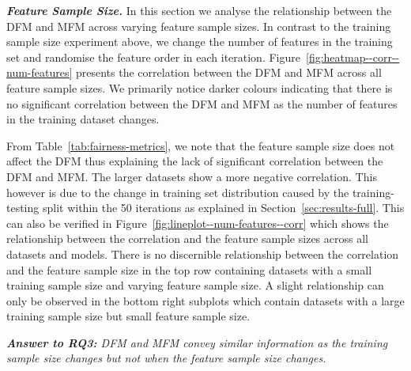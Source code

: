 \documentclass[sigconf,review,anonymous]{acmart}
\newcommand{\highlight}[1]{\begin{framed}%
  \noindent\emph{#1}
\end{framed}}
\begin{document}
\textbf{\emph{Feature Sample Size.}} In this section we analyse the
relationship between the DFM and MFM across varying feature sample
sizes. In contrast to the training sample size experiment above, we
change the number of features in the training set and randomise the
feature order in each
iteration. Figure \ref{fig:heatmap--corr--num-features} presents the
correlation between the DFM and MFM across all feature sample
sizes. We primarily notice darker colours indicating that there is no
significant correlation between the DFM and MFM as the number of
features in the training dataset changes.

From Table \ref{tab:fairness-metrics}, we note that the feature sample
size does not affect the DFM thus explaining the lack of significant
correlation between the DFM and MFM. The larger datasets show a more
negative correlation. This however is due to the change in training
set distribution caused by the training-testing split within the 50
iterations as explained in Section \ref{sec:results-full}. This can
also be verified in Figure \ref{fig:lineplot--num-features--corr}
which shows the relationship between the correlation and the feature
sample sizes across all datasets and models. There is no discernible
relationship between the correlation and the feature sample size in
the top row containing datasets with a small training sample size and
varying feature sample size. A slight relationship can only be
observed in the bottom right subplots which contain datasets with
a large training sample size but small feature sample size.

\highlight{\textbf{Answer to RQ3:} DFM and MFM convey similar
information as the training sample size changes but not when the
feature sample size changes.}
\end{document}
